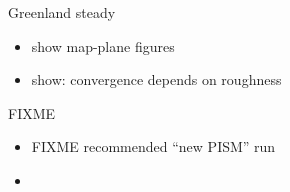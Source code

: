 \documentclass[hide notes,intlimits,usenames,dvipsnames]{beamer}
\begin{document}
\begin{frame}{Greenland steady}
\begin{itemize}
\item show map-plane figures
\item show: convergence depends on roughness
\end{itemize}
\end{frame}


\begin{frame}{FIXME}
\begin{itemize}
\item FIXME recommended ``new PISM'' run
\item 
\end{itemize}
\end{frame}
\end{document}

